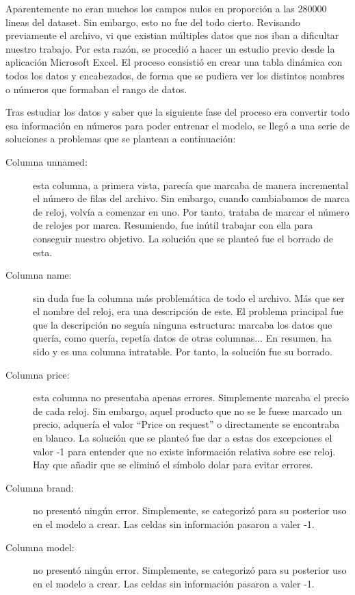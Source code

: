 	Aparentemente no eran muchos los campos nulos en proporción a las 280000 lineas del dataset. Sin embargo, esto no fue del todo cierto. Revisando previamente el archivo, vi que existian múltiples datos que nos iban a dificultar nuestro trabajo. Por esta razón, se procedió a hacer un estudio previo desde la aplicación Microsoft Excel. El proceso consistió en crear una tabla dinámica con todos los datos y encabezados, de forma que se pudiera ver los distintos nombres o números que formaban el rango de datos. 
	
	Tras estudiar los datos y saber que la siguiente fase del proceso era convertir todo esa información en números para poder entrenar el modelo, se llegó a una serie de soluciones a problemas que se plantean a continuación:
	
\begin{description}
	\item[Columna unnamed:] esta columna, a primera vista, parecía que marcaba de manera incremental el número de filas del archivo. Sin embargo, cuando cambiabamos de marca de reloj, volvía a comenzar en uno. Por tanto, trataba de marcar el número de relojes por marca. Resumiendo, fue inútil trabajar con ella para conseguir nuestro objetivo. La solución que se planteó fue el borrado de esta.
	\item[Columna name:] sin duda fue la columna más problemática de todo el archivo. Más que ser el nombre del reloj, era una descripción de este. El problema principal fue que la descripción no seguía ninguna estructura: marcaba los datos que quería, como quería, repetía datos de otras columnas... En resumen, ha sido y es una columna intratable. Por tanto, la solución fue su borrado.
	\item[Columna price:] esta columna no presentaba apenas errores. Simplemente marcaba el precio de cada reloj. Sin embargo, aquel producto que no se le fuese marcado un precio, adquería el valor “Price on request” o directamente se encontraba en blanco. La solución que se planteó fue dar a estas dos excepciones el valor -1 para entender que no existe información relativa sobre ese reloj. Hay que añadir que se eliminó el símbolo dolar para evitar errores.
	\item[Columna brand:] no presentó ningún error. Simplemente, se categorizó para su posterior uso en el modelo a crear. Las celdas sin información pasaron a valer -1.
	\item[Columna model:] no presentó ningún error. Simplemente, se categorizó para su posterior uso en el modelo a crear. Las celdas sin información pasaron a valer -1.

\end{description}

